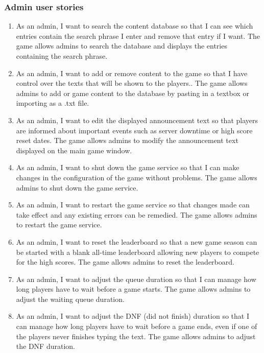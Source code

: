 \documentclass{article}
\begin{document}
\subsubsection{Admin user stories}

\begin{enumerate}
	\item
	      As an admin, I want to search the content database so that I can see which entries contain the search phrase I enter and remove that entry if I want.
	      \AC
	      The game allows admins to search the database and displays the entries containing the search phrase.

	\item
	      As an admin, I want to add or remove content to the game so that I have control over the texts that will be shown to the players..
	      \AC
	      The game allows admins to add or game content to the database by pasting in a textbox or importing as a .txt file.

	\item
	      As an admin, I want to edit the displayed announcement text so that players are informed about important events such as server downtime or high score reset dates.
	      \AC
	      The game allows admins to modify the announcement text displayed on the main game window.

	\item
	      As an admin, I want to shut down the game service so that I can make changes in the configuration of the game without problems.
	      \AC
	      The game allows admins to shut down the game service.

	\item
	      As an admin, I want to restart the game service so that changes made can take effect and any existing errors can be remedied.
	      \AC
	      The game allows admins to restart the game service.

	\item
	      As an admin, I want to reset the leaderboard so that a new game season can be started with a blank all-time leaderboard allowing new players to compete for the high scores.
	      \AC
	      The game allows admins to reset the leaderboard.

	\item
	      As an admin, I want to adjust the queue duration so that I can manage how long players have to wait before a game starts.
	      \AC
	      The game allows admins to adjust the waiting queue duration.

	\item
	      As an admin, I want to adjust the DNF (did not finish) duration so that I can manage how long players have to wait before a game ends, even if one of the players never finishes typing the text.
	      \AC
	      The game allows admins to adjust the DNF duration.
\end{enumerate}
\end{document}
